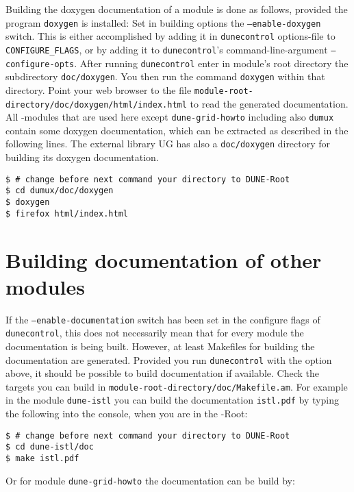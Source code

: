 Building the doxygen documentation of a module is done as follows, provided the program \texttt{doxygen} is installed:
Set in building options the \texttt{--enable-doxygen} switch.
This is either accomplished by adding it in \texttt{dunecontrol} options-file to  \texttt{CONFIGURE\_FLAGS}, or by adding
it to  \texttt{dunecontrol}'s command-line-argument \texttt{--configure-opts}. 
After running \texttt{dunecontrol} enter in module's root directory the subdirectory \texttt{doc/doxygen}.
You then run the command \texttt{doxygen} within that directory. Point your web browser to the file 
\texttt{module-root-directory/doc/doxygen/html/index.html} to read the generated documentation.
All  \Dune-modules that are used here except \texttt{dune-grid-howto}  including also \texttt{dumux} contain some doxygen documentation, which can be extracted as
described in the following lines. The external library UG has also a \texttt{doc/doxygen} directory for building its doxygen documentation.

\begin{lstlisting}[style=Bash]
$ # change before next command your directory to DUNE-Root
$ cd dumux/doc/doxygen
$ doxygen
$ firefox html/index.html
\end{lstlisting}

\section{Building documentation of other \Dune modules}

If the \texttt{--enable-documentation} switch has been set in the configure flags of
\texttt{dunecontrol}, this does not necessarily mean that for every 
\Dune module the documentation is being built.
However, at least Makefiles for building the documentation are generated.
Provided you run \texttt{dunecontrol} with the option above,
it should be possible to build documentation if available.
Check the targets you can build in \texttt{module-root-directory/doc/Makefile.am}.
For example in the module \texttt{dune-istl} you can build the documentation \texttt{istl.pdf} by typing the following into the console, when you are in the \Dune-Root:

\begin{lstlisting}[style=Bash]
$ # change before next command your directory to DUNE-Root
$ cd dune-istl/doc
$ make istl.pdf
\end{lstlisting}

Or for module \texttt{dune-grid-howto} the documentation can be build by: 


